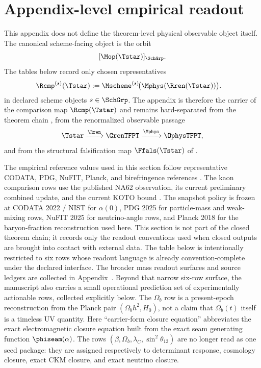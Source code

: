 \section{Appendix-level empirical readout}
\label{sec:appendix-empirical-readout}
\label{app:comparison}

This appendix does not define the theorem-level physical observable object itself. The canonical
scheme-facing object is the orbit
\[
[\Mop(\Tstar)]_{\SchGrp}.
\]
The tables below record only chosen representatives
\[
\begin{aligned}
\Rcmp^{(s)}(\Tstar)
&:=
\Mscheme^{(s)}\!\bigl(\Mphys(\Rren(\Tstar))\bigr).
\end{aligned}
\]
in declared scheme objects $s\in\SchGrp$. The appendix is therefore the carrier of the comparison
map $\Rcmp(\Tstar)$ and remains hard-separated from the theorem chain
, from the renormalized observable passage
\[
\Tstar\xrightarrow{\Rren}\GrenTFPT\xrightarrow{\Mphys}\OphysTFPT,
\]
and from the structural falsification map $\Ffals(\Tstar)$ of
.

The empirical reference values used in this section follow representative CODATA, PDG, NuFIT, Planck,
and birefringence references
\cite{codata2022,pdg2025,nufit2025,planck2018,minamiKomatsu2020,eskilt2023,sullivan2025}. The
kaon comparison rows use the published NA62 observation, its current preliminary combined update,
and the current KOTO bound \cite{na62obs2025,na62Moriond2026,koto2024}. The
snapshot policy is frozen at CODATA 2022 / NIST for $\alpha(0)$, PDG 2025 for particle-mass and
weak-mixing rows, NuFIT 2025 for neutrino-angle rows, and Planck 2018 for the baryon-fraction
reconstruction used here. This section is not part of the closed theorem chain; it records only
the readout conventions used when closed outputs are brought into contact with external data.
The table below is intentionally restricted to six rows whose readout language is already
convention-complete under the declared interface. The broader mass readout surfaces and source
ledgers are collected in Appendix~. Beyond that narrow six-row surface, the
manuscript also carries a
small operational prediction set of experimentally actionable rows, collected explicitly below.
The $\Omega_b$ row is a present-epoch reconstruction from the Planck pair $(\Omega_b h^2,H_0)$,
not a claim that $\Omega_b(t)$ itself is a timeless UV quantity. Here \enquote{carrier-form
closure equation} abbreviates the exact electromagnetic closure equation built from the exact seam generating
function $\phiseam(\alpha)$. The rows $(\beta,\Omega_b,\lambda_C,\sin^2\theta_{13})$ are no longer
read as one seed package: they are assigned respectively to determinant response, cosmology
closure, exact CKM closure, and exact neutrino closure.

